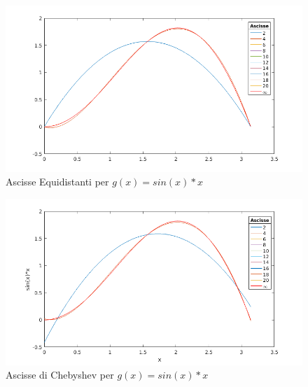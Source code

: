 \begin{figure}
\includegraphics[width=\textwidth]{cap_4/es2/Sin_equi.png}
\caption{Ascisse Equidistanti per $g(x) = sin(x)*x$}
\label{SinEq}
\end{figure}
\begin{figure}
\includegraphics[width=\textwidth]{cap_4/es2/Sin_cheb.png}
\caption{Ascisse di Chebyshev per $g(x) = sin(x)*x$}
\label{SinChe}
\end{figure}

